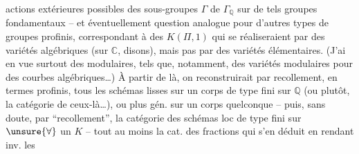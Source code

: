actions extérieures possibles des sous-groupes $\Gamma$ de $\Gamma_{\mathbb{Q}}$ sur de tels groupes fondamentaux -- et éventuellement question analogue pour d'autres types de groupes profinis, correspondant à des $K(\Pi,1)$ qui se réaliseraient par des variétés algébriques (sur $\mathbb{C}$, disons), mais pas par des variétés élémentaires. (J'ai en vue surtout des   modulaires, tels que, notamment, des variétés modulaires pour des courbes algébriques\ldots) À partir de là, on reconstruirait par recollement, en termes profinis, tous les schémas lisses sur un corps de type fini sur $\mathbb{Q}$ (ou plutôt, la catégorie de ceux-là\ldots), ou plus gén. sur un corps quelconque -- puis, sans doute, par ``recollement'', la catégorie des schémas loc de type fini sur $\unsure{\forall}$ un $K$ -- tout au moins la cat. des fractions qui s'en déduit en  rendant inv. les
